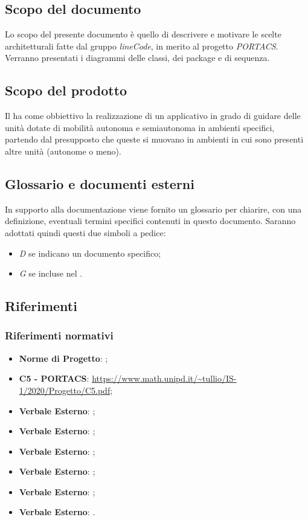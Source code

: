 \subsection{Scopo del documento}
Lo scopo del presente documento è quello di descrivere e motivare le scelte architetturali fatte dal gruppo \textit{lineCode}, in merito al progetto \textit{PORTACS}. Verranno presentati i diagrammi delle classi, dei package e di sequenza.

\subsection{Scopo del prodotto}
Il  ha come obbiettivo la realizzazione di un applicativo  in grado di guidare delle unità dotate di mobilità autonoma e semiautonoma in ambienti specifici, partendo dal presupposto che queste si muovano in ambienti in cui sono presenti altre unità (autonome o meno).

\subsection{Glossario e documenti esterni}
In supporto alla documentazione viene fornito un glossario per chiarire, con una definizione, eventuali termini specifici contenuti in questo documento. Saranno adottati quindi questi due simboli a pedice:
\begin{itemize}
	\item \textit{D} se indicano un documento specifico;
	\item \textit{G} se incluse nel .
\end{itemize}

\subsection{Riferimenti}
\subsubsection{Riferimenti normativi}
\begin{itemize}
	\item \textbf{Norme di Progetto}: ;
	\item \textbf{{ C5 - PORTACS}}: \url{https://www.math.unipd.it/~tullio/IS-1/2020/Progetto/C5.pdf};
	\item \textbf{Verbale Esterno}: ;
	\item \textbf{Verbale Esterno}: ;
	\item \textbf{Verbale Esterno}: ;
	\item \textbf{Verbale Esterno}: ;
	\item \textbf{Verbale Esterno}: ;
	\item \textbf{Verbale Esterno}: .

\end{itemize}
